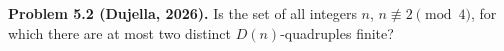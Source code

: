 \textbf{Problem 5.2 (Dujella, 2026).} Is the set of all integers $n$, $n \not\equiv 2 \pmod 4$, for which there are at most two distinct $D(n)$-quadruples finite?
